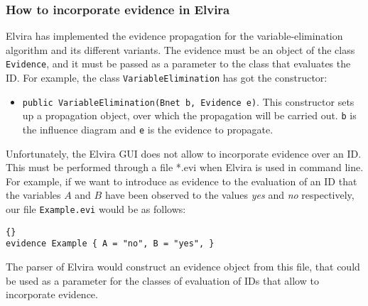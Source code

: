 \subsubsection{How to incorporate evidence in Elvira}

Elvira has implemented the evidence propagation for the variable-elimination
algorithm and its different variants. The evidence must be an object of the
class \texttt{Evidence}, and it must be passed as a parameter to the class
that evaluates the ID. For example, the class \texttt{VariableElimination}
has got the constructor:

\begin{itemize}
\item \texttt{public VariableElimination(Bnet b, Evidence e)}. This
constructor sets up a propagation object, over which the propagation will be
carried out. \texttt{b} is the influence diagram and \texttt{e} is the
evidence to propagate.
\end{itemize}

Unfortunately, the Elvira GUI does not allow to incorporate evidence over an
ID. This must be performed through a file *.evi when Elvira is used in
command line. For example, if we want to introduce as evidence to the
evaluation of an ID that the variables $A$ and $B$ have been observed to the
values \emph{yes} and \emph{no} respectively, our file \verb|Example.evi|
would be as follows:

\begin{lstlisting}[frame=trBL, caption=Example.evi, label=ExampleEvi]{}
evidence Example { A = "no", B = "yes", }
\end{lstlisting}

The parser of Elvira would construct an evidence object from this file, that
could be used as a parameter for the classes of evaluation of IDs that allow
to incorporate evidence.
